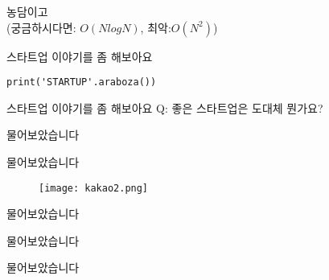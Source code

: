 \documentclass{beamer}
\begin{document}
\begin{frame}
농담이고\\
(궁금하시다면: $O(NlogN)$, 최악:$O(N^2)$)
\end{frame}

\begin{frame}[fragile]{스타트업 이야기를 좀 해보아요}
\begin{lstlisting}
print('STARTUP'.araboza())
\end{lstlisting}
\end{frame}

\begin{frame}[fragile]{스타트업 이야기를 좀 해보아요}
Q: 좋은 스타트업은 도대체 뭔가요?
\end{frame}

\begin{frame}[fragile]{물어보았습니다}
\begin{figure}[H]
  \centering
\end{figure}
\end{frame}

\begin{frame}[fragile]{물어보았습니다}
\begin{figure}[H]
  \texttt{[image: kakao2.png]}
\end{figure}
\end{frame}

\begin{frame}[fragile]{물어보았습니다}
\begin{figure}[H]
  \centering
\end{figure}
\end{frame}

\begin{frame}[fragile]{물어보았습니다}
\begin{figure}[H]
  \centering
\end{figure}
\end{frame}

\begin{frame}[fragile]{물어보았습니다}
\begin{figure}[H]
  \centering
\end{figure}
\end{frame}
\end{document}
